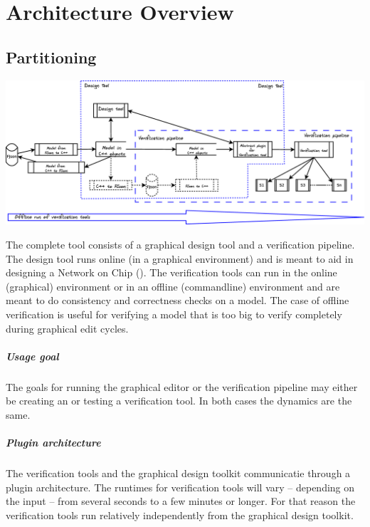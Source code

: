 \chapter{Architecture Overview}

\section{Partitioning}

\begin{center}
	\includegraphics[width=.9\linewidth]{../architecture-tool-scope}
\end{center}

The complete tool consists of a graphical design tool and a verification pipeline.
The design tool runs online (in a graphical environment) and is meant to aid in 
designing a Network on Chip (\Noc). The verification tools can run in the online 
(graphical) environment or in an offline (commandline) environment and are meant 
to do consistency and correctness checks on a model.
The case of offline verification is useful for verifying a model that is 
too big to verify completely during graphical edit cycles.

\paragraph{Usage goal} The goals for running the graphical editor 
or the verification pipeline may either be creating an \Noc or 
testing a verification tool. In both cases the dynamics are the same.

\paragraph{Plugin architecture} The verification tools and the graphical 
design toolkit communicatie through a plugin architecture.
The runtimes for verification tools will vary -- depending on the input --
from several seconds to a few minutes or longer. For that reason the 
verification tools run relatively independently from the graphical 
design toolkit. 

